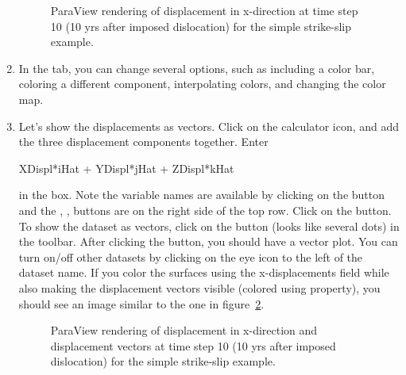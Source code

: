 \begin{enumerate}
  \begin{figure}[htbp]
    \begin{center}
      \caption{ParaView rendering of displacement in x-direction at
          time step 10 (10 yrs after imposed dislocation) for the
          simple strike-slip example.}
      \label{fig:splitcube:xdisp:t10}
    \end{center}
  \end{figure}
  
\item In the  tab, you can change several options,
  such as including a color bar, coloring a different component,
  interpolating colors, and changing the color map.
\item Let's show the displacements as vectors. Click on the calculator
  icon, and add the three displacement components together. Enter
  \begin{screen}
  XDispl*iHat + YDispl*jHat + ZDispl*kHat
  \end{screen}
  in the 
  box. Note the variable names are available by clicking on the
   button and the ,
  ,  buttons are on the right side of
  the top row. Click on the  button. To show the
  dataset as vectors, click on the  button (looks
  like several dots) in the toolbar. After clicking the
   button, you should have a vector plot. You can
  turn on/off other datasets by clicking on the eye icon to the left
  of the dataset name. If you color the surfaces using the
  x-displacements field while also making the displacement vectors
  visible (colored using property), you should see an image similar to
  the one in figure~\ref{fig:splitcube:xdisp:vec:t10}.

  \begin{figure}[htbp]
    \begin{center}
      \caption{ParaView rendering of displacement in x-direction and
        displacement vectors at time step 10 (10 yrs after imposed
        dislocation) for the simple strike-slip example.}
      \label{fig:splitcube:xdisp:vec:t10}
    \end{center}
  \end{figure}      

\end{enumerate}

